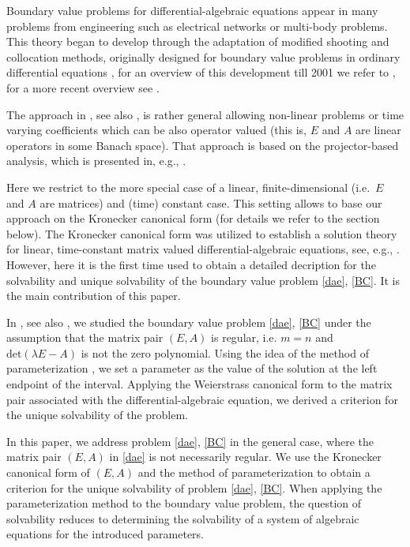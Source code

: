 \documentclass[preprint,12pt]{elsarticle}
\numberwithin{equation}{section}
\theoremstyle{definition}
\begin{document}
Boundary value problems for differential-algebraic equations appear in many problems from engineering such as electrical networks or multi-body problems.
This theory began to develop through the adaptation of modified shooting and collocation methods, originally designed for boundary value problems in ordinary differential equations \cite{ascher1992projected, bai1992modified, clark1989numerical, stover2001collocation},
for an overview of this development till 2001 we refer to \cite{RabierRheinboldt02}, for a more recent overview see \cite{Lamour_Maerz2015}.

The approach in \cite{Lamour_Maerz2015}, see also 
\cite{lamour2013differential,marz1996canonical, marz2004solvability},
is rather general allowing non-linear
problems or time varying coefficients which can be also
operator valued (this is, $E$ and $A$ are linear operators in some Banach space). That approach is based on the projector-based analysis, which is presented in, e.g., \cite{lamour2013differential}.

Here we restrict to the more special
case of a linear, finite-dimensional (i.e.\ $E$ and $A$ are matrices) and (time) constant case. This setting allows to base our approach on the Kronecker canonical form (for details we refer to the section below). The Kronecker canonical form was utilized to establish a solution theory for linear, time-constant 
matrix valued differential-algebraic equations, see, e.g., \cite{berger_diss,Trenn13}. However, here it is the first  time used to obtain a detailed decription for the solvability and unique solvability of the  boundary value problem \eqref{dae}, \eqref{BC}. It is the main contribution of this paper.  

In \cite{Assanova_Trunk_Uteshova_2024}, see also \cite{berger2016linear}, we studied the boundary value problem \eqref{dae}, \eqref{BC} under the assumption that the matrix pair $(E,A)$ is regular, i.e. $m=n$ and $\text{det}(\lambda E-A)$ is not the zero polynomial. Using the idea of the method of parameterization \cite{Dzhumabaev:1989}, we set a parameter as the value of the solution at the left endpoint of the interval. Applying the Weierstrass canonical form to the matrix pair associated with the differential-algebraic equation, we derived a criterion for the unique solvability of the problem.

In this paper, we address problem \eqref{dae}, \eqref{BC} in the general case, where the matrix pair $(E,A)$ in \eqref{dae} is not necessarily regular. We use the Kronecker canonical form of $(E,A)$ and the method of parameterization to obtain a criterion for the unique solvability of problem \eqref{dae}, \eqref{BC}. When applying the parameterization method to the boundary value problem, the question of solvability reduces to determining the solvability of a system of algebraic equations for the introduced parameters. 
\end{document}
